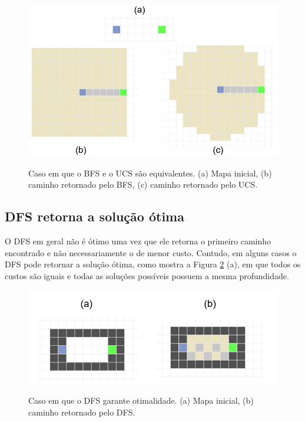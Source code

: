 \documentclass[letterpaper]{article} %
\begin{document}
\begin{figure}[htb]
	\centering 
    \caption{Caso em que o BFS e o UCS são equivalentes. (a) Mapa inicial, (b)
	caminho retornado pelo BFS, (c) caminho retornado pelo UCS.}
	\includegraphics[width=\columnwidth]{images/BFS_UCS_equiv.png}
	\label{fig:BFS_UCS_equiv}
\end{figure}


\subsection{DFS retorna a solução ótima}

O DFS em geral não é ótimo uma vez que ele retorna o primeiro caminho encontrado
e não necessariamente o de menor custo. Contudo, em alguns casos o DFS pode
retornar a solução ótima, como mostra a Figura \ref{fig:DFS_otimo} (a), em que 
todos os custos são iguais e todas as soluções possíveis possuem a mesma 
profundidade.

\begin{figure}[htb]
	\centering 
    \caption{Caso em que o DFS garante otimalidade. (a) Mapa inicial, (b)
	caminho retornado pelo DFS.}
	\includegraphics[width=\columnwidth]{images/DFS_otimo.png}
	\label{fig:DFS_otimo}
\end{figure}
\end{document}
